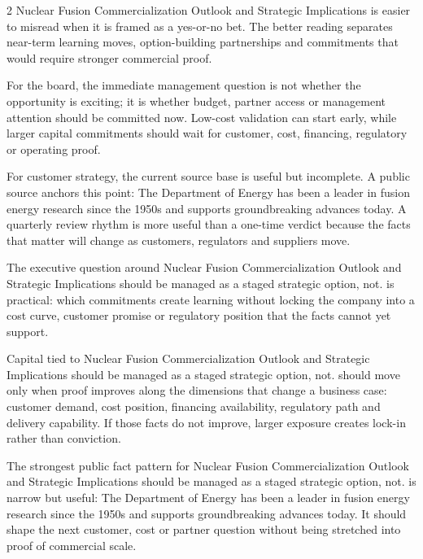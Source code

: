 \documentclass[10pt,a4paper]{article}
\begin{document}
\begin{multicols}{2}
{\small Nuclear Fusion Commercialization Outlook and Strategic Implications is easier to misread when it is framed as a yes-or-no bet. The better reading separates near-term learning moves, option-building partnerships and commitments that would require stronger commercial proof.}\par
{\small For the board, the immediate management question is not whether the opportunity is exciting; it is whether budget, partner access or management attention should be committed now. Low-cost validation can start early, while larger capital commitments should wait for customer, cost, financing, regulatory or operating proof.}\par
{\small For customer strategy, the current source base is useful but incomplete. A public source anchors this point: The Department of Energy has been a leader in fusion energy research since the 1950s and supports groundbreaking advances today. A quarterly review rhythm is more useful than a one-time verdict because the facts that matter will change as customers, regulators and suppliers move.}\par
{\small The executive question around Nuclear Fusion Commercialization Outlook and Strategic Implications should be managed as a staged strategic option, not. is practical: which commitments create learning without locking the company into a cost curve, customer promise or regulatory position that the facts cannot yet support.}\par
{\small Capital tied to Nuclear Fusion Commercialization Outlook and Strategic Implications should be managed as a staged strategic option, not. should move only when proof improves along the dimensions that change a business case: customer demand, cost position, financing availability, regulatory path and delivery capability. If those facts do not improve, larger exposure creates lock-in rather than conviction.}\par
{\small The strongest public fact pattern for Nuclear Fusion Commercialization Outlook and Strategic Implications should be managed as a staged strategic option, not. is narrow but useful: The Department of Energy has been a leader in fusion energy research since the 1950s and supports groundbreaking advances today. It should shape the next customer, cost or partner question without being stretched into proof of commercial scale.}\par
\end{multicols}
\label{chap:4:end}
\end{document}
